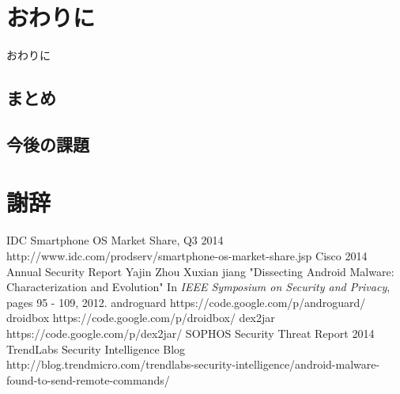 \documentclass[12pt]{jsarticle}
\begin{document}
\newpage
\section{おわりに}
\label{sec:concl}
おわりに
\subsection{まとめ}

\subsection{今後の課題}

\newpage
\section*{謝辞}
\begin{thebibliography}{9}
	 IDC Smartphone OS Market Share, Q3 2014 \\http://www.idc.com/prodserv/smartphone-os-market-share.jsp
	 Cisco 2014 Annual Security Report
	 Yajin Zhou Xuxian jiang "Dissecting Android Malware: Characterization and Evolution" In {\it IEEE Symposium on Security and Privacy}, pages 95 - 109, 2012.
	 androguard https://code.google.com/p/androguard/
	 droidbox https://code.google.com/p/droidbox/
	 dex2jar https://code.google.com/p/dex2jar/
	 SOPHOS Security Threat Report 2014
	 TrendLabs Security Intelligence Blog\\http://blog.trendmicro.com/trendlabs-security-intelligence/android-malware-found-to-send-remote-commands/
	
\end{thebibliography}
\end{document}

